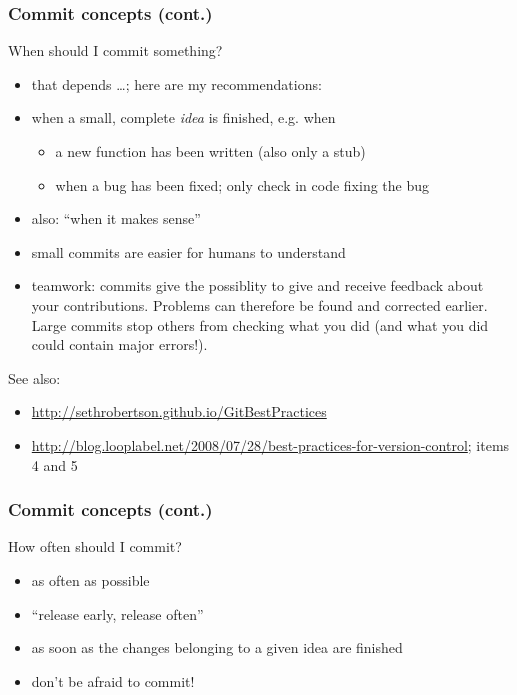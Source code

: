 \begin{frame}
    \frametitle{Commit concepts (cont.)}
    \begin{alertblock}{When should I commit something?}
        \vspace*{-4mm}
        \begin{itemize}
            \item that depends \ldots; here are my recommendations:
            \item when a small, complete \emph{idea} is finished, e.g. when
                \begin{itemize}
                    \item a new function has been written (also only a stub)
                    \item when a bug has been fixed; only check in code
                        fixing the bug
                \end{itemize}
            \item also: \enquote{when it makes sense}
            \item small commits are easier for humans to understand
            \item teamwork: commits give the possiblity to give and receive
                feedback about your contributions.  Problems can therefore
                be found and corrected earlier.  Large commits stop others
                from checking what you did (and what you did could contain
                major errors!).
        \end{itemize}
    \end{alertblock}
    \vspace*{-5mm}
    See also:
    \begin{itemize}
            \tiny
        \item \url{http://sethrobertson.github.io/GitBestPractices}
        \item \url{http://blog.looplabel.net/2008/07/28/best-practices-for-version-control};
            items 4 and 5
            \normalsize
    \end{itemize}
\end{frame}

\begin{frame}[fragile]
    \frametitle{Commit concepts (cont.)}
    \begin{alertblock}{How often should I commit?}
        \begin{itemize}
            \item as often as possible
            \item \enquote{release early, release often}
            \item as soon as the changes belonging to a given idea are finished
            \item don't be afraid to commit!
        \end{itemize}
    \end{alertblock}
\end{frame}

